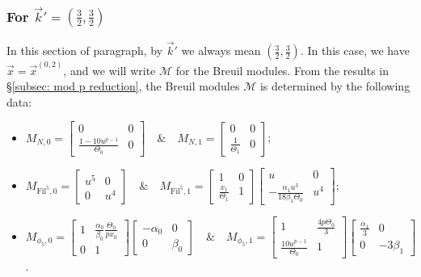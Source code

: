 \documentclass[11pt]{amsart}
\theoremstyle{definition}
\numberwithin{equation}{subsection}
\theoremstyle{plain}
\theoremstyle{plain}
\theoremstyle{plain}
\theoremstyle{plain}
\theoremstyle{plain}
\theoremstyle{plain}
\theoremstyle{plain}
\theoremstyle{plain}
\theoremstyle{plain}
\theoremstyle{plain}
\theoremstyle{plain}
\theoremstyle{plain}
\theoremstyle{definition}
\theoremstyle{definition}
\theoremstyle{definition}
\theoremstyle{remark}
\renewcommand{\(}{\textup{(}}
\renewcommand{\)}{\textup{)}}
\newcommand{\cM}{\mathcal{M}}
\newcommand{\Fil}{\mathrm{Fil}}
\newcommand{\vx}{\vec{x}}
\newcommand{\vk}{\vec{k}}
\begin{document}
\subsubsection{\textbf{For $\vk'=(\frac{3}{2},\frac{3}{2})$}}\label{subsubsec: vr=(1,5), vk=(3/2,3/2)}
In this section of paragraph, by $\vk'$ we always mean $(\frac{3}{2},\frac{3}{2})$. In this case, we have $\vx=\vx^{(0,2)}$, and we will write $\cM$ for the Breuil modules. From the results in \S\ref{subsec: mod p reduction}, the Breuil modules $\cM$ is determined by the following data:
\begin{itemize}[leftmargin=*]
  \item $M_{N,0}=
  \begin{bmatrix}
    0 & 0 \\
    \frac{1-10u^{p-1}}{\Theta_0} & 0
  \end{bmatrix}\quad\&\quad
  M_{N,1}=
  \begin{bmatrix}
    0 & 0 \\
    \frac{1}{\Theta_1} & 0
  \end{bmatrix}$;
  \item $M_{\Fil^5,0}=
  \begin{bmatrix}
    u^5 & 0 \\
    0 & u^4
  \end{bmatrix}\quad\&\quad
  M_{\Fil^5,1}=
  \begin{bmatrix}
    1 & 0 \\
    \frac{x_1}{\Theta_1} & 1
  \end{bmatrix}
  \begin{bmatrix}
    u & 0 \\
    -\frac{\alpha_1u^3}{18\beta_1\Theta_0} & u^4
  \end{bmatrix}$;
  \item $M_{\phi_5,0}=
  \begin{bmatrix}
    1 & \frac{\alpha_0}{\beta_0}\frac{\Theta_0}{px_0}\\
    0 & 1
  \end{bmatrix}
  \begin{bmatrix}
    -\alpha_0 & 0\\
    0 & \beta_0
  \end{bmatrix}\quad\&\quad
  M_{\phi_5,1}=
  \begin{bmatrix}
    1 & \frac{4p\Theta_0}{3} \\
    \frac{10u^{p-1}}{\Theta_0} & 1
  \end{bmatrix}
  \begin{bmatrix}
    \frac{\alpha_1}{3} & 0\\
    0 & -3\beta_1
  \end{bmatrix}$.
\end{itemize}
\end{document}
